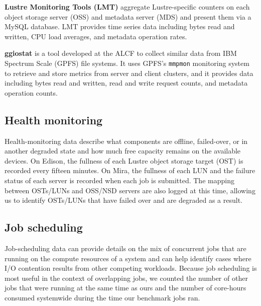 \label{sec:methods/lmt}
\textbf{Lustre Monitoring Tools (LMT)} aggregate Lustre-specific counters on each object storage server (OSS) and metadata server (MDS) and present them via a MySQL database.
LMT provides time series data including bytes read and written, CPU load averages, and metadata operation rates.

\label{sec:methods/ggiostat}
\textbf{ggiostat} is a tool developed at the ALCF to collect similar data from IBM Spectrum Scale (GPFS) file systems.
It uses GPFS's \texttt{mmpmon} monitoring system to retrieve and store metrics from server and client clusters, and it provides data including bytes read and written, read and write request counts, and metadata operation counts.

\subsection{Health monitoring} \label{sec:methods/health}

Health-monitoring data describe what components are offline, failed-over, or in another degraded state and how much free capacity remains on the available devices.
On Edison, the fullness of each Lustre object storage target (OST) is recorded every fifteen minutes.  
On Mira, the fullness of each LUN and the failure status of each server is recorded when each job is submitted.
The mapping between OSTs/LUNs and OSS/NSD servers are also logged at this time, allowing us to identify OSTs/LUNs that have failed over and are degraded as a result.

\subsection{Job scheduling} \label{sec:methods/scheduling}

Job-scheduling data can provide details on the mix of concurrent jobs that are running on the compute resources of a system and can help identify cases where I/O contention results from other competing workloads.
Because job scheduling is most useful in the context of overlapping jobs, we counted the number of other jobs that were running at the same time as ours and the number of core-hours consumed systemwide during the time our benchmark jobs ran.


